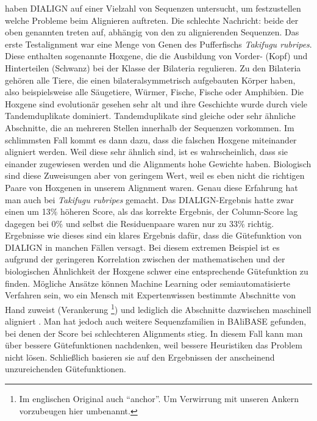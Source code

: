 \cite{mpps06} haben DIALIGN auf einer Vielzahl von Sequenzen untersucht, um festzustellen welche Probleme beim Alignieren auftreten. Die schlechte Nachricht: beide der oben genannten treten auf, abhängig von den zu alignierenden Sequenzen. Das erste Testalignment war eine Menge von Genen des Pufferfischs \emph{Takifugu rubripes}. Diese enthalten sogenannte Hoxgene, die die Ausbildung von Vorder- (Kopf) und Hinterteilen (Schwanz) bei der Klasse der Bilateria regulieren. Zu den Bilateria gehören alle Tiere, die einen bilateralsymmetrisch aufgebauten Körper haben, also beispielsweise alle Säugetiere, Würmer, Fische, Fische oder Amphibien. Die Hoxgene sind evolutionär gesehen sehr alt und ihre Geschichte wurde durch viele Tandemduplikate dominiert. Tandemduplikate sind gleiche oder sehr ähnliche Abschnitte, die an mehreren Stellen innerhalb der Sequenzen vorkommen. Im schlimmsten Fall kommt es dann dazu, dass die falschen Hoxgene miteinander aligniert werden. Weil diese sehr ähnlich sind, ist es wahrscheinlich, dass sie einander zugewiesen werden und die Alignments hohe Gewichte haben. Biologisch sind diese Zuweisungen aber von geringem Wert, weil es eben nicht die richtigen Paare von Hoxgenen in unserem Alignment waren. Genau diese Erfahrung hat man auch bei \emph{Takifugu rubripes} gemacht. Das DIALIGN-Ergebnis hatte zwar einen um 13\% höheren Score, als das korrekte Ergebnis, der Column-Score lag dagegen bei 0\% und selbst die Residuenpaare waren nur zu 33\% richtig. Ergebnisse wie dieses sind ein klares Ergebnis dafür, dass die Gütefunktion von DIALIGN in manchen Fällen versagt. Bei diesem extremen Beispiel ist es aufgrund der geringeren Korrelation zwischen der mathematischen und der biologischen Ähnlichkeit der Hoxgene schwer eine entsprechende Gütefunktion zu finden. Mögliche Ansätze können Machine Learning oder semiautomatisierte Verfahren sein, wo ein Mensch mit Expertenwissen bestimmte Abschnitte von Hand zuweist (Verankerung \footnote{Im englischen Original auch \enquote{anchor}. Um Verwirrung mit unseren Ankern vorzubeugen hier umbenannt.}) und lediglich die Abschnitte dazwischen maschinell aligniert \cite{mpps06}. Man hat jedoch auch weitere Sequenzfamilien in BAliBASE gefunden, bei denen der Score bei schlechteren Alignments stieg. In diesem Fall kann man über bessere Gütefunktionen nachdenken, weil bessere Heuristiken das Problem nicht lösen. Schließlich basieren sie auf den Ergebnissen der anscheinend unzureichenden Gütefunktionen.

